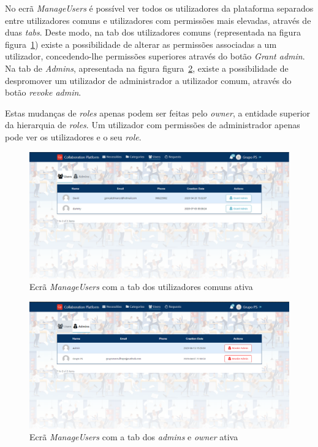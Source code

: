No ecrã \textit{ManageUsers} é possível ver todos os utilizadores da plataforma separados entre utilizadores comuns e utilizadores com permissões mais elevadas, através de duas \textit{tabs}.
Deste modo, na tab dos utilizadores comuns (representada na figura figura~\ref{fig:backoffice_users_users}) existe a possibilidade de alterar as permissões associadas a um utilizador, concedendo-lhe permissões superiores através do botão \textit{Grant admin}.
Na tab de \textit{Admins}, apresentada na figura figura~\ref{fig:backoffice_users_admin}, existe a possibilidade de despromover um utilizador de administrador a utilizador comum, através do botão \textit{revoke admin}. 
\par
Estas mudanças de \textit{roles} apenas podem ser feitas pelo \textit{owner}, a entidade superior da hierarquia de \textit{roles}. Um utilizador com permissões de administrador apenas pode ver os utilizadores e o seu \textit{role}. 

\begin{figure}[H]
  \centering 
  \includegraphics[scale=0.35]{figures/backoffice_users_users.png}
  \caption{Ecrã \textit{ManageUsers} com a tab dos utilizadores comuns ativa }\label{fig:backoffice_users_users}
\end{figure}



\begin{figure}[H]
  \centering 
  \includegraphics[scale=0.35]{figures/backoffice_users_admin.png}
  \caption{Ecrã \textit{ManageUsers} com a tab dos \textit{admins} e \textit{owner} ativa }\label{fig:backoffice_users_admin}
\end{figure}

